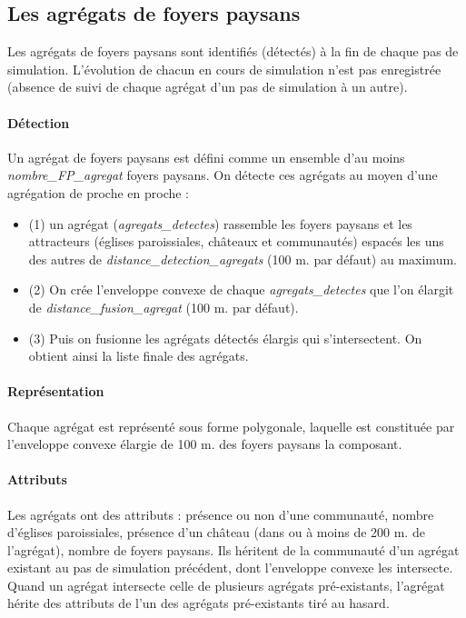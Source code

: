 \documentclass[a4paper,11pt]{article}
\begin{document}
\subsection{Les agrégats de foyers paysans}

Les agrégats de foyers paysans sont identifiés (détectés) à la fin de chaque pas de simulation. L'évolution de chacun en cours de simulation n'est pas enregistrée (absence de suivi de chaque agrégat d'un pas de simulation à un autre).

\paragraph{Détection}
Un agrégat de foyers paysans est défini comme un ensemble d'au moins \textit{nombre\_FP\_agregat} foyers paysans. On détecte ces agrégats au moyen d'une agrégation de proche en proche :
\begin{itemize}
  \item (1) un agrégat (\textit{agregats\_detectes}) rassemble les foyers paysans et les attracteurs (églises paroissiales, châteaux et communautés) espacés les uns des autres de \textit{distance\_detection\_agregats} (100 m. par défaut) au maximum.
  \item (2) On crée l'enveloppe convexe de chaque \textit{agregats\_detectes} que l'on élargit de \textit{distance\_fusion\_agregat} (100 m. par défaut).
  \item (3) Puis on fusionne les agrégats détectés élargis qui s'intersectent. On obtient ainsi la liste finale des agrégats.
\end{itemize}

\paragraph{Représentation}
Chaque agrégat est représenté sous forme polygonale, laquelle est constituée par l'enveloppe convexe élargie de 100 m. des foyers paysans la composant.

\paragraph{Attributs}
Les agrégats ont des attributs : présence ou non d'une communauté, nombre d'églises paroissiales, présence d'un château (dans ou à moins de 200 m. de l'agrégat), nombre de foyers paysans. Ils héritent de la communauté d'un agrégat existant au pas de simulation précédent, dont l'enveloppe convexe les intersecte. Quand un agrégat intersecte celle de plusieurs agrégats pré-existants, l'agrégat hérite des attributs de l'un des agrégats pré-existants tiré au hasard.
\end{document}
